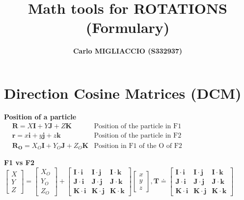 \documentclass[a4paper, 12pt]{article}
\title{
    \vspace{-1.5cm}
    \textbf{Math tools for ROTATIONS (Formulary)}
    \vspace{-0.3cm}
    }
\author{
    \textsf{\textbf{Carlo MIGLIACCIO (S332937)}}}
\date{}
\begin{document}
\maketitle

\vspace{-1.5cm}
\section*{Direction Cosine Matrices (DCM)}
{\small{

\textbf{Position of a particle}  \quad
 $ \begin{aligned}
        &\mathbf{R} = X\mathbf{I} + Y \mathbf{J} + Z \mathbf{K}
        &\text{Position of the particle in F1}\\
        &\mathbf{r} = x \mathbf{i} + y \mathbf{j} + z \mathbf{k}
        &\text{Position of the particle in F2}\\
        &\mathbf{R_O}=X_O \mathbf{I} + Y_O \mathbf{J} + Z_O \mathbf{K}
        &\text{Position in F1 of the O of F2}
    \end{aligned}$

  \noindent
\textbf{F1 vs F2} \quad
    $\begin{bmatrix}
        X\\Y\\Z
    \end{bmatrix} = 
    \begin{bmatrix}
        X_O\\Y_O\\Z_O
    \end{bmatrix}+
    \begin{bmatrix}
        \mathbf{I \cdot i}&\mathbf{I \cdot j}&\mathbf{I \cdot k}\\
        \mathbf{J \cdot i}&\mathbf{J \cdot j}&\mathbf{J \cdot k}\\
        \mathbf{K \cdot i}&\mathbf{K \cdot j}&\mathbf{K \cdot  k }
    \end{bmatrix}
    \begin{bmatrix}
        x\\y\\z
    \end{bmatrix}, \mathbf{T} \doteq \begin{bmatrix}
        \mathbf{I \cdot i}&\mathbf{I \cdot j}&\mathbf{I \cdot k}\\
        \mathbf{J \cdot i}&\mathbf{J \cdot j}&\mathbf{J \cdot k}\\
        \mathbf{K \cdot i}&\mathbf{K \cdot j}&\mathbf{K \cdot  k }
    \end{bmatrix}$

}}
\end{document}
